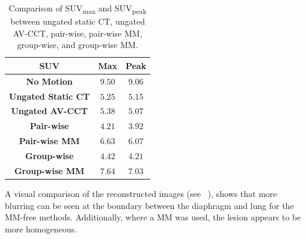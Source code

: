             \begin{table}
                \centering
                
                \captionsetup{singlelinecheck=false}
                \caption{
                    Comparison of \gls{SUV}\textsubscript{max} and \gls{SUV}\textsubscript{peak} between ungated static \gls{CT}, ungated \gls{AV-CCT}, pair-wise, pair-wise \gls{MM}, group-wise, and group-wise \gls{MM}.
                }
                
                \resizebox*{1.0\linewidth}{!}
                {
                    \begin{tabular}{||c|cc||}
                        \hline
                        \textbf{\gls{SUV}}                  & \textbf{Max}  & \textbf{Peak} \\
                        \hline
                        \textbf{No Motion}                  & $9.50$        & $9.06$ \\
                        \hline
                        \textbf{Ungated Static \gls{CT}}    & $5.25$        & $5.15$ \\
                        \textbf{Ungated \gls{AV-CCT}}       & $5.38$        & $5.07$ \\
                        \hline
                        \textbf{Pair-wise}                  & $4.21$        & $3.92$ \\
                        \textbf{Pair-wise \gls{MM}}         & $6.63$        & $6.07$ \\
                        \hline
                        \textbf{Group-wise}                 & $4.42$        & $4.21$ \\
                        \textbf{Group-wise \gls{MM}}        & $7.64$        & $7.03$ \\
                        \hline
                    \end{tabular}
                }
                \label{tab:comparison_of_motion_correction_methods_incorporating_motion_modelling_for_pet_ct_using_a_single_breath_hold_attenuation_map_results_suv}
            \end{table}
            
            A visual comparison of the reconstructed images (see ~), shows that more blurring can be seen at the boundary between the diaphragm and lung for the \gls{MM}-free methods. Additionally, where a \gls{MM} was used, the lesion appears to be more homogeneous.
             
